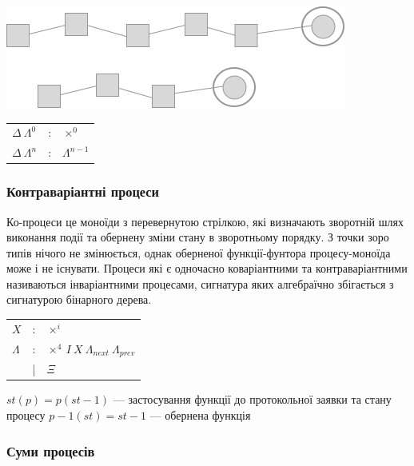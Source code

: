 \documentclass[11pt,oneside]{article}
\begin{document}
   \begin{center}
   \includegraphics[scale=0.3]{img/exe-feed}
   \end{center}

\begin{center}
\begin{tabular}{lcl}
$\Delta \ \Lambda^0$         &:& $\times^0$ \\
$\Delta \ \Lambda^{n}$       &:& $\Lambda^{n-1}$ \\
\end{tabular}
\end{center}

  \subsubsection*{Контраваріантні процеси}

  Ко-процеси це моноїди з перевернутою стрілкою, які визначають зворотній шлях виконання
  події та обернену зміни стану в зворотньому порядку. З точки зоро типів нічого не змінюється,
  однак оберненої функції-фунтора процесу-моноїда може і не існувати. Процеси які є
  одночасно коваріантними та контраваріантними називаються інваріантними процесами, сигнатура яких
  алгебраїчно збігається з сигнатурою бінарного дерева.

\begin{center}
\begin{tabular}{lcl}
$X$         &:& $\times^{i}$ \\
$\Lambda$   &:& $\times^{4} \ I \ X \ \Lambda_{next} \ \Lambda_{prev}$ \\
            &|& $\Xi$ \\
\end{tabular}
\end{center}

\begin{center}
$st(p) = p(st-1)$ — застосування функції до протокольної заявки та стану процесу
$p-1(st) = st-1$ — обернена функція
\end{center}

  \subsubsection*{Суми процесів}
\end{document}
